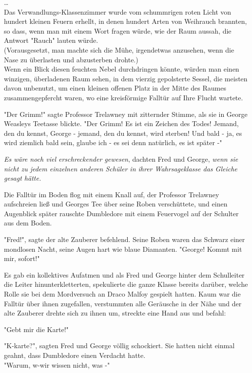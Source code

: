 {…\\ Das Verwandlungs-Klassenzimmer wurde vom schummrigen roten Licht von hundert kleinen Feuern erhellt, in denen hundert Arten von Weihrauch brannten, so dass, wenn man mit einem Wort fragen würde, wie der Raum aussah, die Antwort "Rauch" lauten würde.\\ (Vorausgesetzt, man machte sich die Mühe, irgendetwas anzusehen, wenn die Nase zu überlasten und abzusterben drohte.)\\ Wenn ein Blick diesen feuchten Nebel durchdringen könnte, würden man einen winzigen, überladenen Raum sehen, in dem vierzig gepolsterte Sessel, die meisten davon unbenutzt, um einen kleinen offenen Platz in der Mitte des Raumes zusammengepfercht waren, wo eine kreisförmige Falltür auf Ihre Flucht wartete.

"Der Grimm!" sagte Professor Trelawney mit zitternder Stimme, als sie in George Weasleys Teetasse blickte. "Der Grimm! Es ist ein Zeichen des Todes! Jemand, den du kennst, George - jemand, den du kennst, wird sterben! Und bald - ja, es wird ziemlich bald sein, glaube ich - es sei denn natürlich, es ist später -"

\emph{Es wäre noch viel erschreckender gewesen}, dachten Fred und George, \emph{wenn sie nicht zu jedem einzelnen anderen Schüler in ihrer Wahrsageklasse das Gleiche gesagt hätte.}

Die Falltür im Boden flog mit einem Knall auf, der Professor Trelawney aufschreien ließ und Georges Tee über seine Roben verschüttete, und einen Augenblick später rauschte Dumbledore mit einem Feuervogel auf der Schulter aus dem Boden.

"Fred!", sagte der alte Zauberer befehlend. Seine Roben waren das Schwarz einer mondlosen Nacht, seine Augen hart wie blaue Diamanten. "George! Kommt mit mir, sofort!"

Es gab ein kollektives Aufatmen und als Fred und George hinter dem Schulleiter die Leiter hinunterkletterten, spekulierte die ganze Klasse bereits darüber, welche Rolle sie bei dem Mordversuch an Draco Malfoy gespielt hatten. Kaum war die Falltür über ihnen zugefallen, verstummten alle Geräusche in der Nähe und der alte Zauberer drehte sich zu ihnen um, streckte eine Hand aus und befahl:

"Gebt mir die Karte!"

"K-karte?", sagten Fred und George völlig schockiert. Sie hatten nicht einmal geahnt, dass Dumbledore einen Verdacht hatte.\\ "Warum, w-wir wissen nicht, was -"

}
